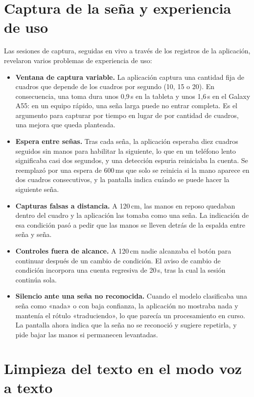 \section{Captura de la seña y experiencia de uso}

Las sesiones de captura, seguidas en vivo a través de los registros de la aplicación, revelaron varios problemas de experiencia de uso:

\begin{itemize}
    \item \textbf{Ventana de captura variable.} La aplicación captura una cantidad fija de cuadros que depende de los cuadros por segundo (10, 15 o 20). En consecuencia, una toma dura unos 0,9\,s en la tableta y unos 1,6\,s en el Galaxy A55: en un equipo rápido, una seña larga puede no entrar completa. Es el argumento para capturar por tiempo en lugar de por cantidad de cuadros, una mejora que queda planteada.
    \item \textbf{Espera entre señas.} Tras cada seña, la aplicación esperaba diez cuadros seguidos sin manos para habilitar la siguiente, lo que en un teléfono lento significaba casi dos segundos, y una detección espuria reiniciaba la cuenta. Se reemplazó por una espera de 600\,ms que solo se reinicia si la mano aparece en dos cuadros consecutivos, y la pantalla indica cuándo se puede hacer la siguiente seña.
    \item \textbf{Capturas falsas a distancia.} A 120\,cm, las manos en reposo quedaban dentro del cuadro y la aplicación las tomaba como una seña. La indicación de esa condición pasó a pedir que las manos se lleven detrás de la espalda entre seña y seña.
    \item \textbf{Controles fuera de alcance.} A 120\,cm nadie alcanzaba el botón para continuar después de un cambio de condición. El aviso de cambio de condición incorpora una cuenta regresiva de 20\,s, tras la cual la sesión continúa sola.
    \item \textbf{Silencio ante una seña no reconocida.} Cuando el modelo clasificaba una seña como «nada» o con baja confianza, la aplicación no mostraba nada y mantenía el rótulo «traduciendo», lo que parecía un procesamiento en curso. La pantalla ahora indica que la seña no se reconoció y sugiere repetirla, y pide bajar las manos si permanecen levantadas.
\end{itemize}

\section{Limpieza del texto en el modo voz a texto}

